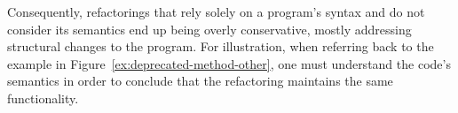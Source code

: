 \documentclass[sigconf,review,anonymous]{acmart}
\begin{document}
Consequently, refactorings that rely solely on a program's syntax
and do not consider its semantics end up
being overly conservative, mostly addressing structural changes
to the program.  For illustration, when referring back to the example in
Figure~\ref{ex:deprecated-method-other}, one must understand the code's semantics in order to conclude that the
refactoring maintains the same functionality.
%
%
%
%
%
\end{document}
